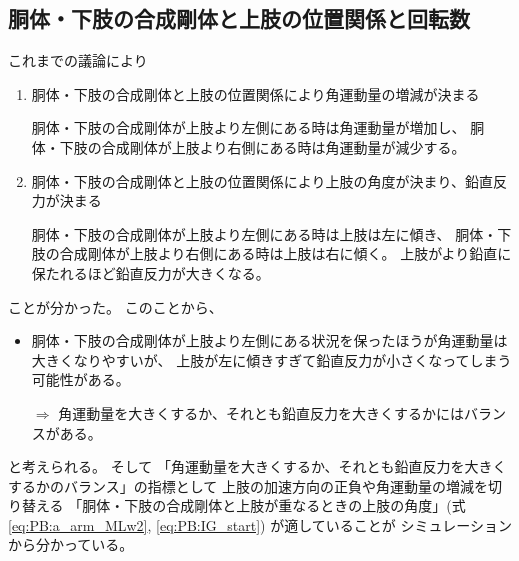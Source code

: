 \documentclass[a4paper,11pt]{jsarticle}
\begin{document}
\subsection{胴体・下肢の合成剛体と上肢の位置関係と回転数}
これまでの議論により
\begin{enumerate}
  \item 胴体・下肢の合成剛体と上肢の位置関係により角運動量の増減が決まる
  
  胴体・下肢の合成剛体が上肢より左側にある時は角運動量が増加し、
  胴体・下肢の合成剛体が上肢より右側にある時は角運動量が減少する。
  \item 胴体・下肢の合成剛体と上肢の位置関係により上肢の角度が決まり、鉛直反力が決まる
  
  胴体・下肢の合成剛体が上肢より左側にある時は上肢は左に傾き、
  胴体・下肢の合成剛体が上肢より右側にある時は上肢は右に傾く。
  上肢がより鉛直に保たれるほど鉛直反力が大きくなる。
\end{enumerate}
ことが分かった。
このことから、
\begin{itemize}
  \item 胴体・下肢の合成剛体が上肢より左側にある状況を保ったほうが角運動量は大きくなりやすいが、
  上肢が左に傾きすぎて鉛直反力が小さくなってしまう可能性がある。

  $\Rightarrow$ 角運動量を大きくするか、それとも鉛直反力を大きくするかにはバランスがある。
\end{itemize}
と考えられる。
そして
「角運動量を大きくするか、それとも鉛直反力を大きくするかのバランス」の指標として
上肢の加速方向の正負や角運動量の増減を切り替える
「胴体・下肢の合成剛体と上肢が重なるときの上肢の角度」(式\ref{eq:PB:a_arm_MLw2}, \ref{eq:PB:IG_start})
が適していることが
シミュレーションから分かっている。
\end{document}
